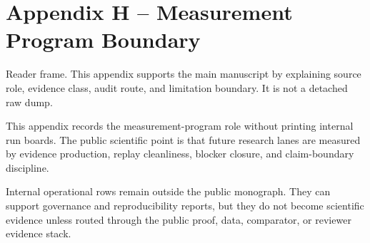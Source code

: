 \section{Appendix H -- Measurement Program Boundary}
Reader frame. This appendix supports the main manuscript by explaining source role, evidence class, audit route, and limitation boundary. It is not a detached raw dump.


\label{sec:oc-core-1-3-institute-run-measurement-program-summary}

This appendix records the measurement-program role without printing internal run boards. The public scientific point is that future research lanes are measured by evidence production, replay cleanliness, blocker closure, and claim-boundary discipline.


Internal operational rows remain outside the public monograph. They can support governance and reproducibility reports, but they do not become scientific evidence unless routed through the public proof, data, comparator, or reviewer evidence stack.
